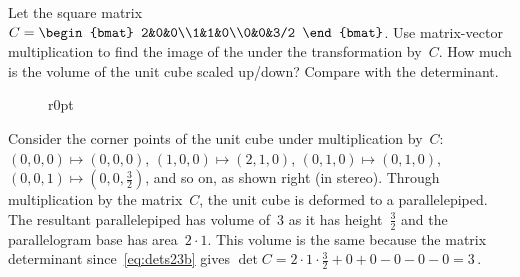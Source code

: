 \begin{example} \label{eg:detarea3}
Let the square matrix \(C=\begin{bmat} 2&0&0\\1&1&0\\0&0&3/2 \end{bmat}\).
Use matrix-vector multiplication to find the image of the  under the transformation by~\(C\).
How much is the volume of the unit cube scaled up/down?  
Compare with the determinant.

\begin{solution} 
\begin{wrapfigure}[7]r{0pt}
\def\unithousesize{small}
\end{wrapfigure}
Consider the corner points of the unit cube under multiplication by~\(C\): \((0,0,0)\mapsto(0,0,0)\)\index{$\mapsto$}, \((1,0,0)\mapsto(2,1,0)\), \((0,1,0)\mapsto(0,1,0)\),  \((0,0,1)\mapsto(0,0,\frac32)\), and so on, as shown right (in stereo).
Through multiplication by the matrix~\(C\), the unit cube is deformed to a parallelepiped.
The resultant parallelepiped has volume of~\(3\) as it has height~\(\frac32\) and the parallelogram base has area~\(2\cdot1\).
This volume is the same because the matrix determinant since~\eqref{eq:dets23b} gives \(\det C=2\cdot1\cdot\frac32+0+0-0-0-0=3\)\,.
\aqed

\end{solution}
\end{example}






\begin{wrapfigure}{r}{0pt} 
\end{wrapfigure}
